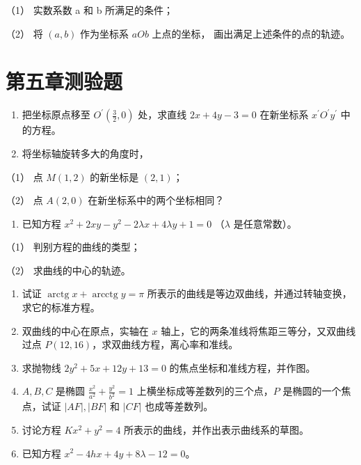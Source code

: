（1） 实数系数 a 和 b 所满足的条件；

（2） 将 \((a, b)\) 作为坐标系 \(aOb\) 上点的坐标，
画出满足上述条件的点的轨迹。

\section{第五章测验题}\label{ux7b2cux4e94ux7ae0ux6d4bux9a8cux9898}

\begin{enumerate}
\def\labelenumi{\arabic{enumi}.}
\item
  把坐标原点移至 \(O^{\prime}\left(\frac{3}{2}, 0\right)\) 处，求直线
  \(2x + 4y - 3 = 0\) 在新坐标系 \(x^{\prime}O^{\prime}y^{\prime}\)
  中的方程。
\item
  将坐标轴旋转多大的角度时，
\end{enumerate}

（1） 点 \(M(1, 2)\) 的新坐标是 \((2, 1)\)；

（2） 点 \(A(2,0)\) 在新坐标系中的两个坐标相同？

\begin{enumerate}
\def\labelenumi{\arabic{enumi}.}
\setcounter{enumi}{2}
\tightlist
\item
  已知方程 \(x^{2} + 2xy - y^{2} - 2\lambda x + 4\lambda y + 1 = 0\)
  （\(\lambda\) 是任意常数）。
\end{enumerate}

（1） 判别方程的曲线的类型；

（2） 求曲线的中心的轨迹。

\begin{enumerate}
\def\labelenumi{\arabic{enumi}.}
\setcounter{enumi}{3}
\item
  试证 \(\operatorname{arctg} x + \operatorname{arcctg} y = \pi\)
  所表示的曲线是等边双曲线，并通过转轴变换，求它的标准方程。
\item
  双曲线的中心在原点，实轴在 \(x\)
  轴上，它的两条准线将焦距三等分，又双曲线过点
  \(P(12, 16)\)，求双曲线方程，离心率和准线。
\item
  求抛物线 \(2y^{2} + 5x + 12y + 13 = 0\) 的焦点坐标和准线方程，并作图。
\item
  \(A, B, C\) 是椭圆 \(\frac{x^2}{a^2} + \frac{y^2}{b^2} = 1\)
  上横坐标成等差数列的三个点，\(P\) 是椭圆的一个焦点，试证
  \(|AF|, |BF|\) 和 \(|CF|\) 也成等差数列。
\item
  讨论方程 \(Kx^{2} + y^{2} = 4\) 所表示的曲线，并作出表示曲线系的草图。
\item
  已知方程 \(x^{2} - 4h x + 4y + 8\lambda - 12 = 0\)。
\end{enumerate}

